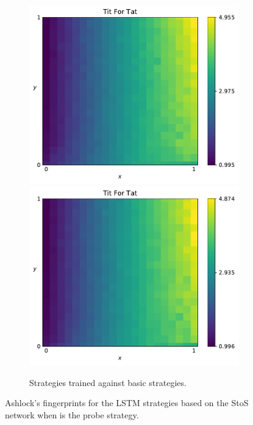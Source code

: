 \begin{figure}[!htbp]
\begin{subfigure}{\textwidth}
        \includegraphics[width=.3\textwidth]{src/chapters/07/img/tit_for_tat_basic_sequence_1.pdf}
        \includegraphics[width=.3\textwidth]{src/chapters/07/img/tit_for_tat_basic_sequence_0_78.pdf}
        \caption{Strategies trained against basic strategies.}
    \end{subfigure}
    \caption{Ashlock's fingerprints for the LSTM strategies based on the StoS
    network when \TitForTat is the probe strategy.}\label{fig:ashlock_fingerprints_tft_s_to_s}
\end{figure}


